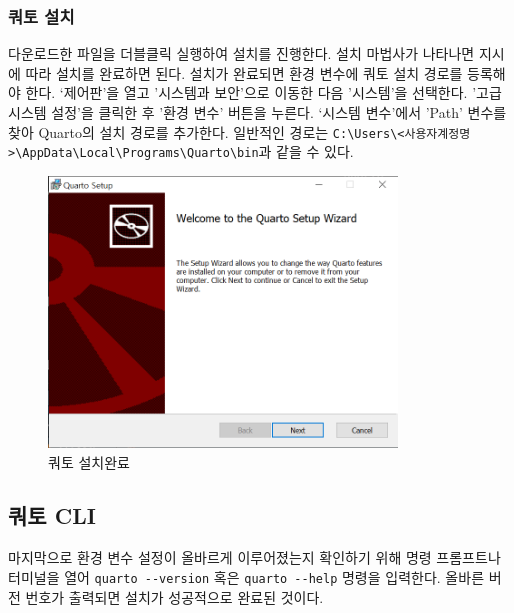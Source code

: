 \documentclass[
  letterpaper,
]{book}
\begin{document}
\hypertarget{uxcffcuxd1a0-uxc124uxce58-1}{%
\subsubsection{쿼토 설치}\label{uxcffcuxd1a0-uxc124uxce58-1}}

다운로드한 파일을 더블클릭 실행하여 설치를 진행한다. 설치 마법사가
나타나면 지시에 따라 설치를 완료하면 된다. 설치가 완료되면 환경 변수에
쿼토 설치 경로를 등록해야 한다. `제어판'을 열고 '시스템과 보안'으로
이동한 다음 '시스템'을 선택한다. '고급 시스템 설정'을 클릭한 후 '환경
변수' 버튼을 누른다. `시스템 변수'에서 'Path' 변수를 찾아 Quarto의 설치
경로를 추가한다. 일반적인 경로는
\texttt{C:\textbackslash{}Users\textbackslash{}\textless{}사용자계정명\textgreater{}\textbackslash{}AppData\textbackslash{}Local\textbackslash{}Programs\textbackslash{}Quarto\textbackslash{}bin}과
같을 수 있다.

\begin{figure}

{\centering \includegraphics[width=3.64583in,height=\textheight]{images/quarto-install.png}

}

\caption{쿼토 설치완료}

\end{figure}

\hypertarget{uxcffcuxd1a0-cli}{%
\subsection{쿼토 CLI}\label{uxcffcuxd1a0-cli}}

마지막으로 환경 변수 설정이 올바르게 이루어졌는지 확인하기 위해 명령
프롬프트나 터미널을 열어 \texttt{quarto\ -\/-version} 혹은
\texttt{quarto\ -\/-help} 명령을 입력한다. 올바른 버전 번호가 출력되면
설치가 성공적으로 완료된 것이다.
\end{document}

